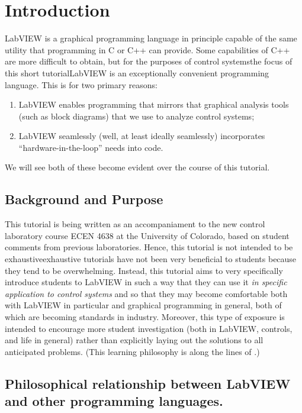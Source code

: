 \section{Introduction}  

LabVIEW is a graphical programming language in principle capable of the same
utility that programming in C or C++ can provide.  Some capabilities of C++ are
more difficult to obtain, but for the purposes of control systems\textendash the focus of
this short tutorial\textendash LabVIEW is an exceptionally convenient programming
language.  This is for two primary reasons:
\begin{enumerate}
\item LabVIEW enables programming that mirrors that graphical analysis tools
  (such as block diagrams) that we use to analyze control systems;
\item LabVIEW seamlessly (well, at least ideally seamlessly) incorporates
  ``hardware-in-the-loop'' needs into code.  
\end{enumerate}
We will see both of these become evident over the course of this tutorial.  

\subsection{Background and Purpose}

This tutorial is being written as an accompaniament to the new control
laboratory course ECEN 4638 \cite{murphey-ace2006} at the University of
Colorado, based on student comments from previous laboratories.  Hence, this
tutorial is not intended to be exhaustive\textendash exhaustive tutorials have not been
very beneficial to students because they tend to be overwhelming.  Instead, this
tutorial aims to very specifically introduce students to LabVIEW in such a way
that they can use it \emph{in specific application to control systems} and so
that they may become comfortable both with LabVIEW in particular and graphical
programming in general, both of which are becoming standards in industry.
Moreover, this type of exposure is intended to encourage more student
investigation (both in LabVIEW, controls, and life in general) rather than
explicitly laying out the solutions to all anticipated problems.  (This learning
philosophy is along the lines of \cite{murphey-te2006}.)

\subsection{Philosophical relationship between LabVIEW and other programming
  languages.}

